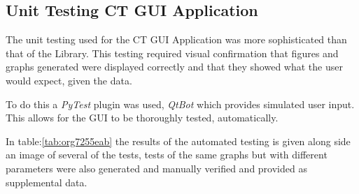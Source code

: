 \documentclass[11pt]{report}
\begin{document}
\clearpage

\subsection{Unit Testing CT GUI Application}
\label{sec:org5e3a99d}

The unit testing used for the CT GUI Application was more sophisticated than that of the Library. This testing required visual confirmation that figures and graphs generated were displayed correctly and that they showed what the user would expect, given the data.

To do this a \emph{PyTest} plugin was used, \emph{QtBot} which provides simulated user input. This allows for the GUI to be thoroughly tested, automatically.

In table:\ref{tab:org7255eab} the results of the automated testing is given along side an image of several of the tests, tests of the same graphs but with different parameters were also generated and manually verified and provided as supplemental data.
\end{document}
